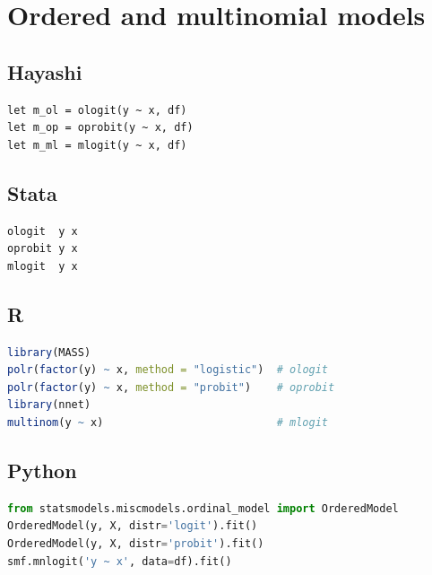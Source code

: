 \section{Ordered and multinomial models}

\subsection*{Hayashi}

\begin{lstlisting}
let m_ol = ologit(y ~ x, df)
let m_op = oprobit(y ~ x, df)
let m_ml = mlogit(y ~ x, df)
\end{lstlisting}

\subsection*{Stata}

\begin{lstlisting}[language={}, basicstyle=\ttfamily\small,
  frame=single, numbers=none, backgroundcolor=\color{codbg}]
ologit  y x
oprobit y x
mlogit  y x
\end{lstlisting}

\subsection*{R}

\begin{lstlisting}[language=R, basicstyle=\ttfamily\small,
  frame=single, numbers=none, backgroundcolor=\color{codbg},
  keywordstyle=\color{keyword}\bfseries,
  stringstyle=\color{string},
  commentstyle=\color{comment}\itshape]
library(MASS)
polr(factor(y) ~ x, method = "logistic")  # ologit
polr(factor(y) ~ x, method = "probit")    # oprobit
library(nnet)
multinom(y ~ x)                           # mlogit
\end{lstlisting}

\subsection*{Python}

\begin{lstlisting}[language=Python, basicstyle=\ttfamily\small,
  frame=single, numbers=none, backgroundcolor=\color{codbg},
  keywordstyle=\color{keyword}\bfseries,
  stringstyle=\color{string},
  commentstyle=\color{comment}\itshape]
from statsmodels.miscmodels.ordinal_model import OrderedModel
OrderedModel(y, X, distr='logit').fit()
OrderedModel(y, X, distr='probit').fit()
smf.mnlogit('y ~ x', data=df).fit()
\end{lstlisting}

